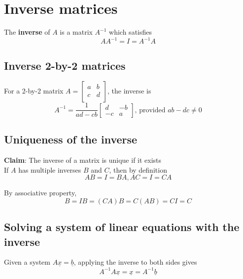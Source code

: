 \section{Inverse matrices}

\begin{framed}
   The \textbf{inverse} of $A$ is a matrix $A^{-1}$ which satisfies  \[
      A A^{-1} = I = A^{-1} A
   \] 
\end{framed}

\subsection{Inverse 2-by-2 matrices}

\begin{framed}
   For a 2-by-2 matrix $A = \begin{bmatrix} a & b \\ c & d \\ \end{bmatrix} $, the inverse is \[
   A^{-1} = \frac{1}{ad-cb} \begin{bmatrix} 
      d & -b \\ -c & a  
   \end{bmatrix} \text{, provided $ab-dc \neq 0$}
   \] 
\end{framed}

\subsection{Uniqueness of the inverse}
\begin{framed}
   \textbf{Claim}: The inverse of a matrix is unique if it exists \\

   If $A$ has multiple inverses $B$ and $C$, then by definition \[
     AB = I = BA, AC = I = CA
   \] 

   By associative property, \[
     B = IB = (CA)B = C(AB) = CI = C
   \] 
\end{framed}

\subsection{Solving a system of linear equations with the inverse}
\begin{framed}
   Given a system $A \underline{x} = \underline{b}$, applying the inverse to both sides gives \[
      A^{-1} A \underline{x} = \underline{x} = A^{-1} \underline{b}
   \] 
\end{framed}

